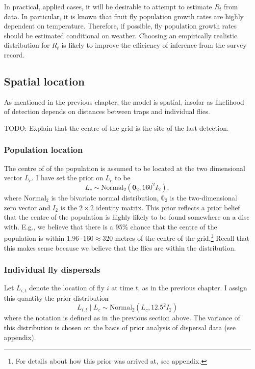 \documentclass[
  oneside]{book}
\begin{document}
In practical, applied cases, it will be desirable to attempt to estimate \(R_t\) from data. In particular, it is known that fruit fly population growth rates are highly dependent on temperature. Therefore, if possible, fly population growth rates should be estimated conditional on weather. Choosing an empirically realistic distribution for \(R_t\) is likely to improve the efficiency of inference from the survey record.

\hypertarget{spatial-location}{%
\subsection{Spatial location}\label{spatial-location}}

As mentioned in the previous chapter, the model is spatial, insofar as likelihood of detection depends on distances between traps and individual flies.

TODO: Explain that the centre of the grid is the site of the last detection.

\hypertarget{population-location}{%
\subsubsection{Population location}\label{population-location}}

The centre of of the population is assumed to be located at the two dimensional vector \(L_c\). I have set the prior on \(L_c\) to be
\[
L_c \sim \mathrm {Normal}_2 (\mathbf 0_2, 160^2 I_2),
\]
where \(\mathrm{Normal}_2\) is the bivariate normal distribution, \(\mathbb 0_2\) is the two-dimensional zero vector and \(I_2\) is the \(2 \times 2\) identity matrix. This prior reflects a prior belief that the centre of the population is highly likely to be found somewhere on a disc with. E.g., we believe that there is a 95\% chance that the centre of the population is within \(1.96 \cdot 160 \approx 320\) metres of the centre of the grid.\footnote{For details about how this prior was arrived at, see appendix.} Recall that this makes sense because we believe that the flies are within the distribution.

\hypertarget{individual-fly-dispersals}{%
\subsubsection{Individual fly dispersals}\label{individual-fly-dispersals}}

Let \(L_{i, t}\) denote the location of fly \(i\) at time \(t\), as in the previous chapter. I assign this quantity the prior distribution
\[
L_{i, t} \mid L_c \sim \mathrm {Normal}_2 (L_c, 12.5^2 I_2)
\]
where the notation is defined as in the previous section above. The variance of this distribution is chosen on the basis of prior analysis of dispersal data (see appendix).
\end{document}
